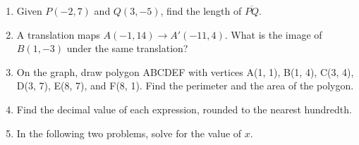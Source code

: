 \documentclass[12pt, twoside]{article}
\begin{document}
\begin{enumerate}
\newpage
  \item Given $P(-2,7)$ and $Q(3,-5)$, find the length of $\overline{PQ}$.
      \vspace{4cm}

  \item A translation maps $A(-1,14) \rightarrow A'(-11,4)$. What is the image of $B(1,-3)$ under the same translation?  \vspace{3cm}

  \item On the graph, draw polygon ABCDEF with vertices A(1, 1), B(1, 4), C(3, 4), D(3, 7), E(8, 7), and F(8, 1). Find the perimeter and the area of the polygon.\\[1cm]
  \vspace{2cm}

\newpage
  \item Find the decimal value of each expression, rounded to the nearest hundredth.
  \begin{enumerate}
  \end{enumerate}
  \vspace{0.5cm}

  \item In the following two problems, solve for the value of $x$.
    \begin{enumerate}
    \end{enumerate}
    \vspace{4cm}


\end{enumerate}
\end{document}
